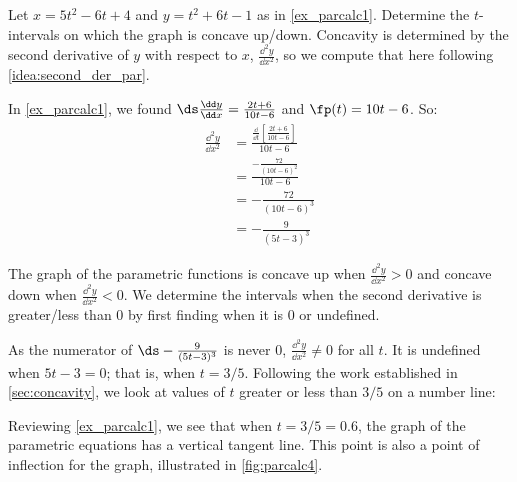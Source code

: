 \begin{example}\label{ex_parcalc4}
Let $x=5t^2-6t+4$ and $y=t^2+6t-1$ as in \autoref{ex_parcalc1}. Determine the $t$-intervals on which the graph is concave up/down.
\solution
Concavity is determined by the second derivative of $y$ with respect to $x$, $\frac{\dd^2y}{\dd x^2}$, so we compute that here following \autoref{idea:second_der_par}.

In \autoref{ex_parcalc1}, we found $\ds\frac{\dd y}{\dd x} = \frac{2t+6}{10t-6}$ and $\fp(t) = 10t-6$. So:
\begin{align*}
	\frac{\dd^2y}{\dd x^2}
	&= \frac{\frac{\dd}{\dd t}\left[\frac{2t+6}{10t-6}\right]}{10t-6} \\
	&= \frac{-\frac{72}{(10t-6)^2}}{10t-6}\\
	&= -\frac{72}{(10t-6)^3} \\&= -\frac{9}{(5t-3)^3}
\end{align*}


The graph of the parametric functions is concave up when $\frac{\dd^2y}{\dd x^2} > 0$ and concave down when $\frac{\dd^2y}{\dd x^2} <0$. We determine the intervals when the second derivative is greater/less than 0 by first finding when it is 0 or undefined.

As the numerator of $\ds -\frac{9}{(5t-3)^3}$ is never 0, $\frac{\dd^2y}{\dd x^2} \neq 0$ for all $t$. It is undefined when $5t-3=0$; that is, when $t= 3/5$. Following the work established in \autoref{sec:concavity}, we look at values of $t$ greater or less than $3/5$ on a number line:
\begin{center}
\end{center}

Reviewing \autoref{ex_parcalc1}, we see that when $t=3/5=0.6$, the graph of the parametric equations has a vertical tangent line. This point is also a point of inflection for the graph, illustrated in \autoref{fig:parcalc4}.
\end{example}

